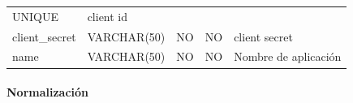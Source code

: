 \documentclass[12pt,a4paperpaper,]{report}
\let\oldparagraph\paragraph
\renewcommand{\paragraph}[1]{\oldparagraph{#1}\mbox{}}
\begin{document}
\begin{longtable}[]{@{}lllll@{}}
\begin{minipage}[t]{0.19\columnwidth}
UNIQUE\strut
\end{minipage} & \begin{minipage}[t]{0.11\columnwidth}\raggedright\strut
client id\strut
\end{minipage}\tabularnewline
\begin{minipage}[t]{0.21\columnwidth}\raggedright\strut
client\_secret\strut
\end{minipage} & \begin{minipage}[t]{0.19\columnwidth}\raggedright\strut
VARCHAR(50)\strut
\end{minipage} & \begin{minipage}[t]{0.16\columnwidth}\raggedright\strut
NO\strut
\end{minipage} & \begin{minipage}[t]{0.19\columnwidth}\raggedright\strut
NO\strut
\end{minipage} & \begin{minipage}[t]{0.11\columnwidth}\raggedright\strut
client secret\strut
\end{minipage}\tabularnewline
\begin{minipage}[t]{0.21\columnwidth}\raggedright\strut
name\strut
\end{minipage} & \begin{minipage}[t]{0.19\columnwidth}\raggedright\strut
VARCHAR(50)\strut
\end{minipage} & \begin{minipage}[t]{0.16\columnwidth}\raggedright\strut
NO\strut
\end{minipage} & \begin{minipage}[t]{0.19\columnwidth}\raggedright\strut
NO\strut
\end{minipage} & \begin{minipage}[t]{0.11\columnwidth}\raggedright\strut
Nombre de aplicación\strut
\end{minipage}\tabularnewline
\bottomrule
\end{longtable}

\paragraph{Normalización}\label{normalizaciuxf3n-1}
\end{document}
